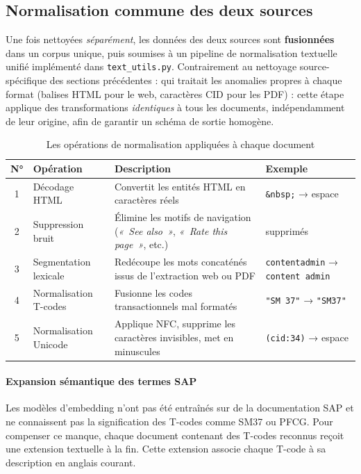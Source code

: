 \subsection{Normalisation commune des deux sources}
\label{subsec:normalisation-commune}

Une fois nettoyées \emph{séparément}, les données des deux sources sont \textbf{fusionnées} dans un corpus unique, puis soumises à un pipeline de normalisation textuelle unifié implémenté dans \texttt{text\_utils.py}. Contrairement au nettoyage source-spécifique des sections précédentes : qui traitait les anomalies propres à chaque format (balises HTML pour le web, caractères CID pour les PDF) : cette étape applique des transformations \emph{identiques} à tous les documents, indépendamment de leur origine, afin de garantir un schéma de sortie homogène.

\begin{table}[H]
\centering
\caption{Les opérations de normalisation appliquées à chaque document}
\label{tab:six-ops}
\begin{tabularx}{\textwidth}{|c|l|X|l|}
\hline
\textbf{N°} & \textbf{Opération} & \textbf{Description} & \textbf{Exemple} \\
\hline
1 & Décodage HTML & Convertit les entités HTML en caractères réels & \texttt{\&nbsp;} → espace \\
\hline
2 & Suppression bruit & Élimine les motifs de navigation (\textit{«~See also~»}, \textit{«~Rate this page~»}, etc.) & supprimés \\
\hline
3 & Segmentation lexicale & Redécoupe les mots concaténés issus de l’extraction web ou PDF & \texttt{contentadmin} → \texttt{content admin} \\
\hline
4 & Normalisation T-codes & Fusionne les codes transactionnels mal formatés & \texttt{"SM 37"} → \texttt{"SM37"} \\
\hline
5 & Normalisation Unicode & Applique NFC, supprime les caractères invisibles, met en minuscules & \texttt{(cid:34)} → espace \\
\hline
\end{tabularx}
\end{table}

\paragraph{Expansion sémantique des termes SAP}

Les modèles d’embedding n’ont pas été entraînés sur de la documentation SAP et ne connaissent pas la signification des T-codes comme SM37 ou PFCG. Pour compenser ce manque, chaque document contenant des T-codes reconnus reçoit une extension textuelle à la fin. Cette extension associe chaque T-code à sa description en anglais courant.
  




